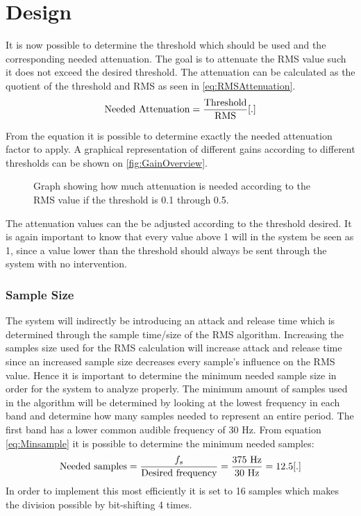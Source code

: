 \section{Design}
It is now possible to determine the threshold which should be used and the corresponding needed attenuation. The goal is to attenuate the RMS value such it does not exceed the desired threshold. The attenuation can be calculated as the quotient of the threshold and RMS as seen in \autoref{eq:RMSAttenuation}.
\begin{equation}\label{eq:RMSAttenuation}
\text{Needed Attenuation} = \frac{\text{Threshold}}{\text{RMS}} \enhed{.}
\end{equation}

From the equation it is possible to determine exactly the needed attenuation factor to apply. A graphical representation of different gains according to different thresholds can be shown on \autoref{fig:GainOverview}.

\begin{figure}[H]
\centering
{}

\caption{Graph showing how much attenuation is needed according to the RMS value if the threshold is 0.1 through 0.5.}
\label{fig:GainOverview}
\end{figure}

The attenuation values can the be adjusted according to the threshold desired. It is again important to know that every value above 1 will in the system be seen as 1, since a value lower than the threshold should always be sent through the system with no intervention.  


\subsubsection{Sample Size}
The system will indirectly be introducing an attack and release time which is determined through the sample time/size of the RMS algorithm. Increasing the samples size used for the RMS calculation will increase attack and release time since an increased sample size decreases every sample's influence on the RMS value. Hence it is important to determine the minimum needed sample size in order for the system to analyze properly. The minimum amount of samples used in the algorithm will be determined by looking at the lowest frequency in each band and determine how many samples needed to represent an entire period. The first band has a lower common audible frequency of 30 Hz. From equation \ref{eq:Minsample} it is possible to determine the minimum needed samples:
\begin{equation}\label{eq:Minsample}
\text{Needed samples} = \frac{f_s}{\text{Desired frequency}} = \frac{375 \text{ Hz}}{30 \text{ Hz}} = 12.5 \enhed{.}
\end{equation} 
In order to implement this most efficiently it is set to 16 samples which makes the division possible by bit-shifting 4 times.

